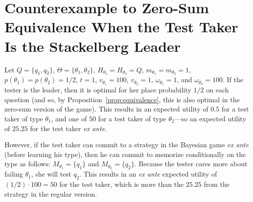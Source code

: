 \documentclass{article}
\begin{document}


\appendix

\section{Counterexample to Zero-Sum Equivalence When the Test Taker Is the
  Stackelberg Leader}
\label{se:counterexample}

Let $Q=\{q_1,q_2\}$, $\Theta=\{\theta_1,\theta_2\}$,
$H_{\theta_1}=H_{\theta_2}=Q$, $m_{\theta_1}=m_{\theta_2}=1$,
$p(\theta_1)=p(\theta_2)=1/2$, $t=1$, $v_{\theta_1} = 100$, $v_{\theta_2} =
1$, $\omega_{\theta_1} = 1$, and $\omega_{\theta_2} = 100$.  If the tester
is the leader, then it is optimal for her place probability $1/2$ on each
question (and so, by Proposition~\ref{prop:equivalence}, this is also
optimal in the zero-sum version of the game).  This results in an expected
utility of $0.5$ for a test taker of type $\theta_1$, and one of $50$ for a
test taker of type $\theta_2$---so an expected utility of $25.25$ for the
test taker {\em ex ante}.

However, if the test taker can commit to a strategy in the Bayesian game
{\em ex ante} (before learning his type), then he can commit to
memorize conditionally on the type as follows: $M_{\theta_1} =\{q_1\}$ and 
$M_{\theta_2} =\{q_2\}$.  Because the tester cares more about failing
$\theta_1$, she will test $q_2$.  This results in an {\em ex ante} expected
utility of $(1/2) \cdot 100 = 50$ for the test taker, which is more than
the $25.25$ from the strategy in the regular version.

















\end{document}
